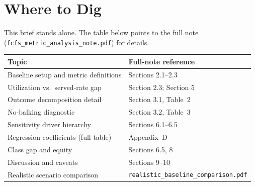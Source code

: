 \documentclass[10pt]{article}
\begin{document}
\section*{Where to Dig}

This brief stands alone. The table below points to the full note
(\texttt{fcfs\_metric\_analysis\_note.pdf}) for details.

\vspace{2pt}
\begin{tabularx}{\textwidth}{L{0.38\textwidth}Y}
\toprule
Topic & Full-note reference \\
\midrule
Baseline setup and metric definitions & Sections 2.1--2.3 \\
Utilization vs.\ served-rate gap & Section 2.3; Section 5 \\
Outcome decomposition detail & Section 3.1, Table~2 \\
No-balking diagnostic & Section 3.2, Table~3 \\
Sensitivity driver hierarchy & Sections 6.1--6.5 \\
Regression coefficients (full table) & Appendix~D \\
Class gap and equity & Sections 6.5, 8 \\
Discussion and caveats & Sections 9--10 \\
Realistic scenario comparison & \texttt{realistic\_baseline\_comparison.pdf} \\
\bottomrule
\end{tabularx}
\end{document}

